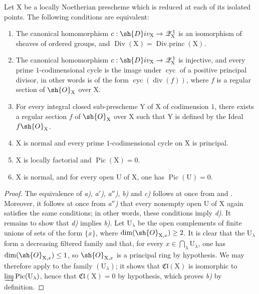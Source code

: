 \begin{corollary}[21.7.6]
\label{IV.21.7.6}
Let $\mathrm{X}$ be a locally Noetherian prescheme which is reduced at each of its isolated points.
The following conditions are equivalent:
\begin{enumerate}
  \item[\emph{a)}] The canonical homomorphism $c:\sh{D}iv_\mathrm{X}\to\mathscr{Z}_\mathrm{X}^1$ is an isomorphism of sheaves of ordered groups, and $\operatorname{Div}(\mathrm{X})=\operatorname{Div.princ}(\mathrm{X})$.
  \item[\emph{a$'$)}] The canonical homomorphism $c:\sh{D}iv_\mathrm{X}\to\mathscr{Z}_\mathrm{X}^1$ is injective, and every prime $1$-codimensional cycle is the image under $\operatorname{cyc}$ of a positive principal divisor, in other words is of the form $\operatorname{cyc}(\operatorname{div}(f))$, where $f$ is a regular section of $\sh{O}_\mathrm{X}$ over $\mathrm{X}$.
  \item[\emph{a$''$)}] For every integral closed sub-prescheme $\mathrm{Y}$ of $\mathrm{X}$ of codimension $1$, there exists a regular section $f$ of $\sh{O}_\mathrm{X}$ over $\mathrm{X}$ such that $\mathrm{Y}$ is defined by the Ideal $f\sh{O}_\mathrm{X}$.
  \item[\emph{b)}] $\mathrm{X}$ is normal and every prime $1$-codimensional cycle on $\mathrm{X}$ is principal.
  \item[\emph{c)}] $\mathrm{X}$ is locally factorial and $\operatorname{Pic}(\mathrm{X})=0$.
  \item[\emph{d)}] $\mathrm{X}$ is normal, and for every open $\mathrm{U}$ of $\mathrm{X}$, one has $\operatorname{Pic}(\mathrm{U})=0$.
\end{enumerate}
\end{corollary}

\begin{proof}
The equivalence of \emph{a)}, \emph{a$'$)}, \emph{a$''$)}, \emph{b)} and \emph{c)} follows at once from  and .
Moreover, it follows at once from \emph{a$''$)} that every nonempty open $\mathrm{U}$ of $\mathrm{X}$ again satisfies the same conditions; in other words, these conditions imply \emph{d)}.
It remains to show that \emph{d)} implies \emph{b)}.
Let $\mathrm{U}_\lambda$ be the open complements of finite unions of sets of the form $\overline{\{x\}}$, where $\dim(\sh{O}_{\mathrm{X},x})\geq 2$.
It is clear that the $\mathrm{U}_\lambda$ form a decreasing filtered family and that, for every $x\in\bigcap_\lambda\mathrm{U}_\lambda$, one has $\dim(\sh{O}_{\mathrm{X},x})\leq 1$, so $\sh{O}_{\mathrm{X},x}$ is a principal ring by hypothesis.
We may therefore apply  to the family $(\mathrm{U}_\lambda)$; it shows that $\mathfrak{Cl}(\mathrm{X})$ is isomorphic to $\varinjlim\operatorname{Pic}(\mathrm{U}_\lambda)$, hence that $\mathfrak{Cl}(\mathrm{X})=0$ by hypothesis, which proves \emph{b)} by definition.
\end{proof}


